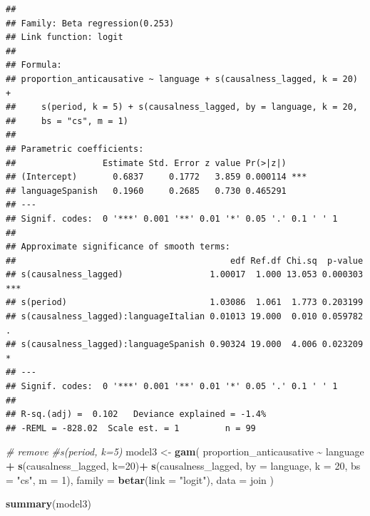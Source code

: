 \documentclass[
]{article}
\newenvironment{Shaded}{\begin{snugshade}}{\end{snugshade}}
\newcommand{\AttributeTok}[1]{\textcolor[rgb]{0.13,0.29,0.53}{#1}}
\newcommand{\CommentTok}[1]{\textcolor[rgb]{0.56,0.35,0.01}{\textit{#1}}}
\newcommand{\DecValTok}[1]{\textcolor[rgb]{0.00,0.00,0.81}{#1}}
\newcommand{\FunctionTok}[1]{\textcolor[rgb]{0.13,0.29,0.53}{\textbf{#1}}}
\newcommand{\NormalTok}[1]{#1}
\newcommand{\OtherTok}[1]{\textcolor[rgb]{0.56,0.35,0.01}{#1}}
\newcommand{\SpecialCharTok}[1]{\textcolor[rgb]{0.81,0.36,0.00}{\textbf{#1}}}
\newcommand{\StringTok}[1]{\textcolor[rgb]{0.31,0.60,0.02}{#1}}
\begin{document}
\begin{verbatim}
## 
## Family: Beta regression(0.253) 
## Link function: logit 
## 
## Formula:
## proportion_anticausative ~ language + s(causalness_lagged, k = 20) + 
##     s(period, k = 5) + s(causalness_lagged, by = language, k = 20, 
##     bs = "cs", m = 1)
## 
## Parametric coefficients:
##                 Estimate Std. Error z value Pr(>|z|)    
## (Intercept)       0.6837     0.1772   3.859 0.000114 ***
## languageSpanish   0.1960     0.2685   0.730 0.465291    
## ---
## Signif. codes:  0 '***' 0.001 '**' 0.01 '*' 0.05 '.' 0.1 ' ' 1
## 
## Approximate significance of smooth terms:
##                                          edf Ref.df Chi.sq  p-value    
## s(causalness_lagged)                 1.00017  1.000 13.053 0.000303 ***
## s(period)                            1.03086  1.061  1.773 0.203199    
## s(causalness_lagged):languageItalian 0.01013 19.000  0.010 0.059782 .  
## s(causalness_lagged):languageSpanish 0.90324 19.000  4.006 0.023209 *  
## ---
## Signif. codes:  0 '***' 0.001 '**' 0.01 '*' 0.05 '.' 0.1 ' ' 1
## 
## R-sq.(adj) =  0.102   Deviance explained = -1.4%
## -REML = -828.02  Scale est. = 1         n = 99
\end{verbatim}

\begin{Shaded}
\begin{Highlighting}[]
\CommentTok{\# remove \#s(period, k=5)}
\NormalTok{model3 }\OtherTok{\textless{}{-}} \FunctionTok{gam}\NormalTok{(}
\NormalTok{  proportion\_anticausative }\SpecialCharTok{\textasciitilde{}} 
\NormalTok{    language }\SpecialCharTok{+}
    \FunctionTok{s}\NormalTok{(causalness\_lagged, }\AttributeTok{k=}\DecValTok{20}\NormalTok{)}\SpecialCharTok{+}
    \FunctionTok{s}\NormalTok{(causalness\_lagged, }\AttributeTok{by =}\NormalTok{ language, }\AttributeTok{k =} \DecValTok{20}\NormalTok{, }\AttributeTok{bs =} \StringTok{"cs"}\NormalTok{, }\AttributeTok{m =} \DecValTok{1}\NormalTok{),}
  \AttributeTok{family =} \FunctionTok{betar}\NormalTok{(}\AttributeTok{link =} \StringTok{"logit"}\NormalTok{),                 }
  \AttributeTok{data =}\NormalTok{ join}
\NormalTok{)}

\FunctionTok{summary}\NormalTok{(model3)}
\end{Highlighting}
\end{Shaded}
\end{document}
